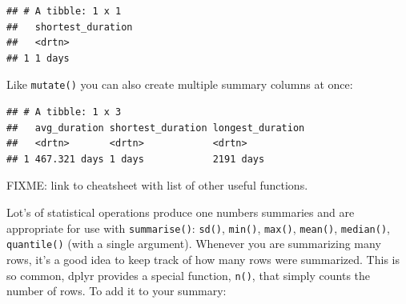 \documentclass[]{Nemilov}
\newenvironment{Shaded}{\begin{snugshade}}{\end{snugshade}}
\newcommand{\DataTypeTok}[1]{\textcolor[rgb]{0.13,0.29,0.53}{#1}}
\newcommand{\KeywordTok}[1]{\textcolor[rgb]{0.13,0.29,0.53}{\textbf{#1}}}
\newcommand{\NormalTok}[1]{#1}
\newcommand{\OperatorTok}[1]{\textcolor[rgb]{0.81,0.36,0.00}{\textbf{#1}}}
\newcommand{\StringTok}[1]{\textcolor[rgb]{0.31,0.60,0.02}{#1}}
\begin{document}
\begin{verbatim}
## # A tibble: 1 x 1
##   shortest_duration
##   <drtn>           
## 1 1 days
\end{verbatim}

Like \texttt{mutate()} you can also create multiple summary columns at once:

\begin{Shaded}
\end{Shaded}

\begin{verbatim}
## # A tibble: 1 x 3
##   avg_duration shortest_duration longest_duration
##   <drtn>       <drtn>            <drtn>          
## 1 467.321 days 1 days            2191 days
\end{verbatim}

FIXME: link to cheatsheet with list of other useful functions.

Lot's of statistical operations produce one numbers summaries and are appropriate for use with \texttt{summarise()}: \texttt{sd()}, \texttt{min()}, \texttt{max()}, \texttt{mean()}, \texttt{median()}, \texttt{quantile()} (with a single argument). Whenever you are summarizing many rows, it's a good idea to keep track of how many rows were summarized. This is so common, dplyr provides a special function, \texttt{n()}, that simply counts the number of rows. To add it to your summary:

\begin{Shaded}
\end{Shaded}
\end{document}
